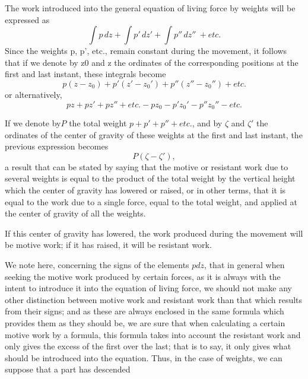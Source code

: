 \documentclass{book}
\begin{document}
 The work introduced into the general equation of living force by weights will be expressed as
\[\int p\,dz + \int p'\,dz' + \int p''\,dz''\ + etc. \]
Since the weights p, p', etc., remain constant during the movement, it follows that if we denote by z0 and z the ordinates of the corresponding positions at the first and last instant, these integrals become
\[ p(z-z_0) + p'(z'-z_0') + p''(z''-z_0'') + etc.\]
or alternatively,
\[ pz + pz' + pz'' + etc. - pz_0 - p'z_0' -  p''z_0'' - etc.\]

If we denote by\(P\) the total weight \(p+p'+p'' + etc.\), and by \(\zeta\) and
\(\zeta'\) the ordinates of the center of gravity of these weights at the first and last instant, the previous expression becomes 
\[P(\zeta-\zeta'),\]
a result that can be stated by saying that the motive or resistant work due to several weights is equal to the product of the total weight by the vertical height which the center of gravity has lowered or raised, or in other terms, that it is equal to the work due to a single force, equal to the total weight, and applied at the center of gravity of all the weights.

If this center of gravity has lowered, the work produced during the movement will be motive work; if it has raised, it will be resistant work.


We note here, concerning the signs of the elements \(pdz\), that in general when seeking the motive work produced by certain forces, as it is always with the intent to introduce it into the equation of living force, we should not make any other distinction between motive work and resistant work than that which results from their signs; and as these are always enclosed in the same formula which provides them as they should be, we are sure that when calculating a certain motive work by a formula, this formula takes into account the resistant work and only gives the excess of the first over the last; that is to say, it only gives what should be introduced into the equation. Thus, in the case of weights, we can suppose that a part has descended
\newpage
\end{document}
